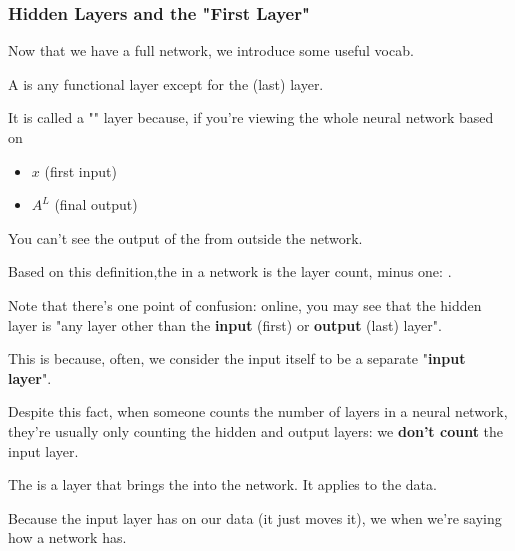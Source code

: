     \subsubsection{Hidden Layers and the "First Layer"}
        
        Now that we have a full network, we introduce some useful vocab.\\
        
        \begin{definition}
            A  is any functional layer except for the  (last) layer.
            
            It is called a "" layer because, if you're viewing the whole neural network based on
            
            \begin{itemize}
                \item {} $x$ (first input)
                
                \item {} $A^L$ (final output)
            \end{itemize}
            
            You can't see the output of the  from outside the network.

            Based on this definition,the  in a network is the layer count, minus one: .
        \end{definition}
        
        Note that there's one point of confusion: online, you may see that the hidden layer is "any layer other than the \textbf{input} (first) or \textbf{output} (last) layer".

        This is because, often, we consider the input itself to be a separate "\textbf{input layer}". 
        
        Despite this fact, when someone counts the number of layers in a neural network, they're usually only counting the hidden and output layers: we \textbf{don't count} the input layer.
            \\

        \begin{definition}
            The  is a layer that brings the  into the network. It applies  to the data.

            Because the input layer has  on our data (it just moves it), we  when we're saying how  a network has.
        \end{definition}

